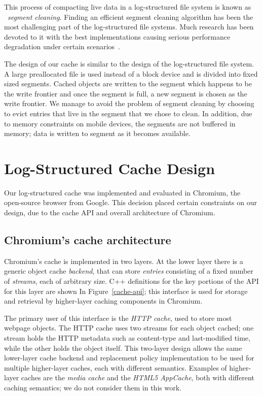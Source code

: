 \documentclass{sig-alternate}
\begin{document}
This process of compacting live data in a log-structured file system is known as
~\emph{segment cleaning}.  Finding an efficient segment cleaning algorithm has
been the most challenging part of the log-structured file systems.  Much
research has been devoted to it with the best implementations causing serious
performance degradation under certain scenarios~\cite{seltzer93}.

The design of our cache is similar to the design of the log-structured file
system.  A large preallocated file is used instead of a block device and is
divided into fixed sized segments.  Cached objects are written to the segment
which happens to be the write frontier and once the segment is full, a new
segment is chosen as the write frontier.  We manage to avoid the problem of
segment cleaning by choosing to evict entries that live in the segment that we
chose to clean.  In addition, due to memory constraints on mobile devices, the
segments are not buffered in memory; data is written to segment as it becomes
available.

\section{Log-Structured Cache Design}

Our log-structured cache was implemented and evaluated in Chromium, the
open-source browser from Google.  This decision placed certain constraints on
our design, due to the cache API and overall architecture of Chromium.

\subsection{Chromium's cache architecture}

Chromium's cache is implemented in two layers.  At the lower layer there is a
generic object cache \emph{backend}, that can store \emph{entries} consisting of
a fixed number of \emph{streams}, each of arbitrary size.  C++ definitions for
the key portions of the API for this layer are shown In Figure~\ref{cache-api};
this interface is used for storage and retrieval by higher-layer caching
components in Chromium.

The primary user of this interface is the \emph{HTTP cache}, used to store most
webpage objects. The HTTP cache uses two streams for each object cached; one
stream holds the HTTP metadata such as content-type and last-modified time,
while the other holds the object itself.  This two-layer design allows the same
lower-layer cache backend and replacement policy implementation to be used for
multiple higher-layer caches, each with different semantics.  Examples of
higher-layer caches are the \emph{media cache} and the \emph{HTML5 AppCache},
both with different caching semantics; we do not consider them in this work.
\end{document}
